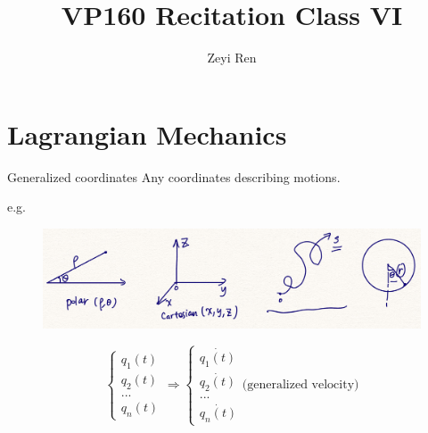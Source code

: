 \documentclass{beamer}
\title{VP160 Recitation Class VI}
\author{Zeyi Ren}
\institute{UM-SJTU Joint Institute}
\begin{document}
\maketitle

\frame{\tableofcontents}
\section{Lagrangian Mechanics}
\begin{frame}
  \begin{block}{Generalized coordinates}
    Any coordinates describing motions.
  \end{block}\pause
  e.g.
  \begin{figure}[H]
  \centering
  \includegraphics[width= 0.8\linewidth, angle =0]{example1.png}
  \label{fig:1}
  \end{figure}\pause
  $$
    \left\{\begin{array}{l}
      q_1(t)\\
      q_2(t)\\
      ...\\
      q_n(t)
      \end{array}\right.\Rightarrow 
      \left\{\begin{array}{l}
        \dot{q_1(t)}\\
        \dot{q_2(t)}\\
        ...\\
        \dot{q_n(t)}
      \end{array}\right. \text{(generalized velocity)}
  $$
\end{frame}
\end{document}
